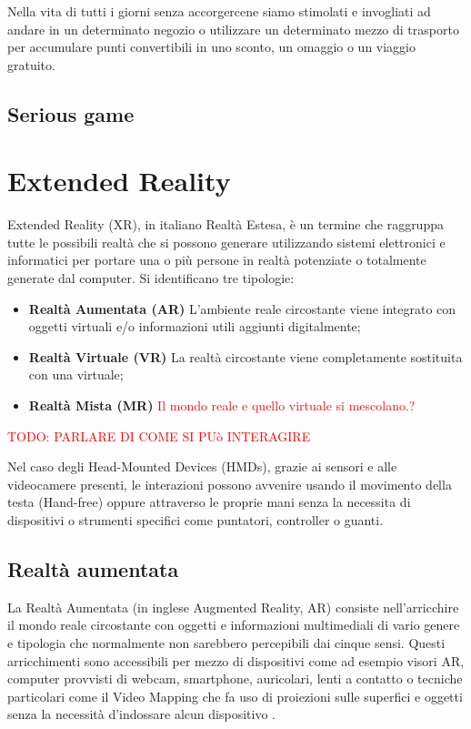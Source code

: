 Nella vita di tutti i giorni senza accorgercene siamo stimolati e invogliati ad andare in un determinato negozio o utilizzare un determinato mezzo di trasporto per accumulare punti convertibili in uno sconto, un omaggio o un viaggio gratuito.
%
\subsection{Serious game}

%
\section{Extended Reality}
Extended Reality (XR), in italiano Realtà Estesa, è un termine che raggruppa tutte le possibili realtà che si possono generare utilizzando sistemi elettronici e informatici per portare una o più persone in realtà potenziate o totalmente generate dal computer.
Si identificano tre tipologie:

\begin{itemize}
    \item \textbf{Realtà Aumentata (AR)} L'ambiente reale circostante viene integrato con oggetti virtuali e/o informazioni utili aggiunti digitalmente;
    \item \textbf{Realtà Virtuale (VR)} La realtà circostante viene completamente sostituita con una virtuale;
    \item \textbf{Realtà Mista (MR)} \textcolor{red}{Il mondo reale e quello virtuale si mescolano.?}
\end{itemize}

\textcolor{red}{TODO: PARLARE DI COME SI PUò INTERAGIRE}

Nel caso degli Head-Mounted Devices (HMDs), grazie ai sensori e alle videocamere presenti, le interazioni possono avvenire usando il movimento della testa (Hand-free) oppure attraverso le proprie mani senza la necessita di dispositivi o strumenti specifici come puntatori, controller o guanti.

\subsection{Realtà aumentata}
La Realtà Aumentata (in inglese Augmented Reality, AR) consiste nell'arricchire il mondo reale circostante con oggetti e informazioni multimediali di vario genere e tipologia che normalmente non sarebbero percepibili dai cinque sensi.
Questi arricchimenti sono accessibili per mezzo di dispositivi come ad esempio visori AR, computer provvisti di webcam, smartphone, auricolari, lenti a contatto o tecniche particolari come il Video Mapping che fa uso di proiezioni sulle superfici e oggetti senza la necessità d'indossare alcun dispositivo \cite{Raskar1999SpatiallyAR}.

